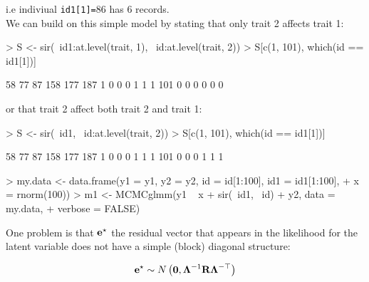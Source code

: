 \documentclass{article}
\begin{document}
i.e indiviual  \texttt{id1[1]=}86 has 6 records.\\

We can build on this simple model by stating that only trait 2 affects trait 1:

\begin{Schunk}
\begin{Sinput}
> S <- sir(~id1:at.level(trait, 1), ~id:at.level(trait, 2))
> S[c(1, 101), which(id == id1[1])]
\end{Sinput}
\begin{Soutput}
    58 77 87 158 177 187
1    0  0  0   1   1   1
101  0  0  0   0   0   0
\end{Soutput}
\end{Schunk}

or that trait 2 affect both trait 2 and trait 1:

\begin{Schunk}
\begin{Sinput}
> S <- sir(~id1, ~id:at.level(trait, 2))
> S[c(1, 101), which(id == id1[1])]
\end{Sinput}
\begin{Soutput}
    58 77 87 158 177 187
1    0  0  0   1   1   1
101  0  0  0   1   1   1
\end{Soutput}
\end{Schunk}


\begin{Schunk}
\begin{Sinput}
> my.data <- data.frame(y1 = y1, y2 = y2, id = id[1:100], id1 = id1[1:100], 
+     x = rnorm(100))
> m1 <- MCMCglmm(y1 ~ x + sir(~id1, ~id) + y2, data = my.data, 
+     verbose = FALSE)
\end{Sinput}
\end{Schunk}

One problem is that ${\bf e}^{\star}$ the residual vector that appears in the likelihood for the latent variable does not have a simple (block) diagonal structure:

\begin{equation}
{\bf e}^{\star} \sim N\left({\bm 0}, {\bm \Lambda}^{-1}{\bf R}{\bm \Lambda}^{-\top}\right)
\end{equation}





\ifalone
\end{document}
